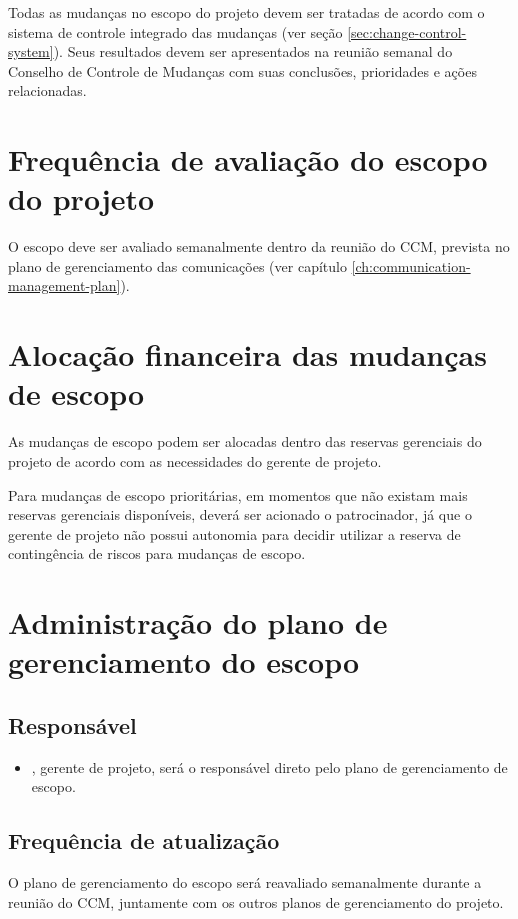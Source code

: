 Todas as mudanças no escopo do projeto devem ser tratadas de acordo com o sistema de controle integrado das mudanças (ver seção \ref{sec:change-control-system}). Seus resultados devem ser apresentados na reunião semanal do Conselho de Controle de Mudanças com suas conclusões, prioridades e ações relacionadas.

\section{Frequência de avaliação do escopo do projeto}

O escopo deve ser avaliado semanalmente dentro da reunião do CCM, prevista no plano de gerenciamento das comunicações (ver capítulo \ref{ch:communication-management-plan}).

\section{Alocação financeira das mudanças de escopo}

As mudanças de escopo podem ser alocadas dentro das reservas gerenciais do projeto de acordo com as necessidades do gerente de projeto.

Para mudanças de escopo prioritárias, em momentos que não existam mais reservas gerenciais disponíveis, deverá ser acionado o patrocinador, já que o gerente de projeto não possui autonomia para decidir utilizar a reserva de contingência de riscos para mudanças de escopo.

\section{Administração do plano de gerenciamento do escopo}

\subsection{Responsável}

\begin{itemize}
	\item \projectManagerName{}, gerente de projeto, será o responsável direto pelo plano de gerenciamento de escopo.
\end{itemize}

\subsection{Frequência de atualização}

O plano de gerenciamento do escopo será reavaliado semanalmente durante a reunião do CCM, juntamente com os outros planos de gerenciamento do projeto.

